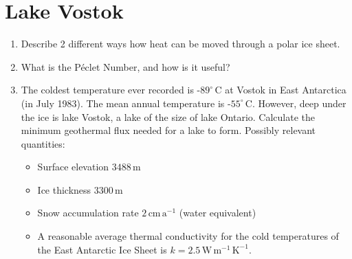 \documentclass[parskip=half]{scrartcl}
\newcommand{\cels}[1]{\ensuremath{#1^{\circ}\,\mathrm{C}}}
\begin{document}
\section{Lake Vostok}

\begin{enumerate}
\item Describe 2 different ways how heat can be moved through a polar ice sheet.
\item What is the P\'eclet Number, and how is it useful?
\item The coldest temperature ever recorded is -\cels{89} at Vostok in East Antarctica (in July 1983). The mean annual temperature is -\cels{55}. However, deep under the ice is lake Vostok, a lake of the size of lake Ontario. Calculate the minimum geothermal flux needed for a lake to form. Possibly relevant quantities:
  \begin{itemize}
  \item Surface elevation $3488\,\text{m}$
  \item Ice thickness $3300\,\text{m}$
  \item Snow accumulation rate $2\,\text{cm}\,\text{a}^{-1}$ (water equivalent)
  \item A reasonable average thermal conductivity for the cold temperatures of the East Antarctic Ice Sheet is $k = 2.5\,\text{W}\,\text{m}^{−1}\,\text{K}^{−1}$.
  \end{itemize}
\end{enumerate}



\end{document}
